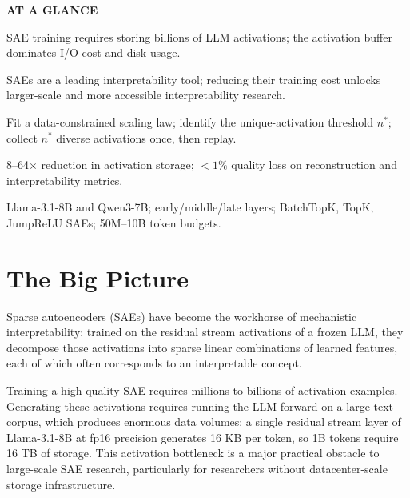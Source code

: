 \documentclass[10pt,twocolumn]{article}
\begin{document}
\begin{mdframed}[backgroundcolor=boxgray,linecolor=rulered,linewidth=1pt,
    innerleftmargin=6pt,innerrightmargin=6pt,
    innertopmargin=6pt,innerbottommargin=6pt]
\textbf{\small AT A GLANCE}\par\vspace{4pt}
\begin{description}[leftmargin=0pt,labelsep=4pt,itemsep=2pt,parsep=0pt,
    font=\small\bfseries]
  \item[Problem:] SAE training requires storing billions of LLM activations;
    the activation buffer dominates I/O cost and disk usage.
  \item[Why it matters:] SAEs are a leading interpretability tool; reducing their
    training cost unlocks larger-scale and more accessible interpretability
    research.
  \item[Method:] Fit a data-constrained scaling law; identify the unique-activation
    threshold $n^*$; collect $n^*$ diverse activations once, then replay.
  \item[Result:] 8--64$\times$ reduction in activation storage; $<1\%$ quality
    loss on reconstruction and interpretability metrics.
  \item[Evidence:] Llama-3.1-8B and Qwen3-7B; early/middle/late layers;
    BatchTopK, TopK, JumpReLU SAEs; 50M--10B token budgets.
\end{description}
\end{mdframed}

\section{The Big Picture}

Sparse autoencoders (SAEs) have become the workhorse of mechanistic
interpretability: trained on the residual stream activations of a frozen LLM,
they decompose those activations into sparse linear combinations of learned
features, each of which often corresponds to an interpretable concept.

Training a high-quality SAE requires millions to billions of activation examples.
Generating these activations requires running the LLM forward on a large text
corpus, which produces enormous data volumes: a single residual stream layer of
Llama-3.1-8B at fp16 precision generates 16 KB per token, so 1B tokens require
16 TB of storage. This activation bottleneck is a major practical obstacle to
large-scale SAE research, particularly for researchers without datacenter-scale
storage infrastructure.
\end{document}

